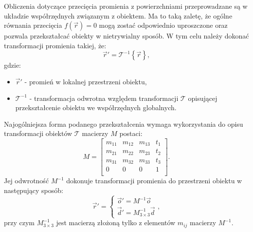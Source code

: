 \begin{enumerate}

Obliczenia dotyczące przecięcia promienia z powierzchniami przeprowadzane są w układzie współrzędnych związanym z obiektem. Ma to taką zaletę, że ogólne równania przecięcia $f(\vec{r})=0$ mogą zostać odpowiednio uproszczone oraz pozwala przekształcać obiekty w nietrywialny sposób. W tym celu należy dokonać transformacji promienia takiej, że:
\begin{equation}
\vec{r}' = \mathcal{T}^{-1}\left\lbrace\vec{r}\right\rbrace,
\end{equation}
gdzie:
\begin{itemize}
\item[] $\vec{r}'$ - promień w lokalnej przestrzeni obiektu,
\item[] $\mathcal{T}^{-1}$ - transformacja odwrotna względem transformacji $\mathcal{T}$ opisującej przekształcenie obiektu we współrzędnych globalnych.
\end{itemize}
Najogólniejsza forma podanego przekształcenia wymaga wykorzystania do opisu transformacji obiektów $\mathcal{T}$  macierzy $M$ postaci:
\begin{equation}
M = 
\begin{bmatrix}
    m_{11} & m_{12} & m_{13}  & t_{1} \\
    m_{21} & m_{22} & m_{23}   & t_{2} \\
    m_{31} & m_{32} & m_{33}   & t_{3} \\
    0 & 0 & 0 & 1 \\
\end{bmatrix}.
\end{equation}
Jej odwrotność $M^{-1}$ dokonuje transformacji promienia do przestrzeni obiektu w następujący sposób:
\begin{equation}
\vec{r}' = 
\begin{cases}
\vec{o}' = M^{-1}\vec{o}\\
\vec{d}' = M_{3\times 3}^{-1}\vec{d}
\end{cases},
\end{equation}
przy czym $M_{3\times 3}^{-1}$ jest macierzą złożoną tylko z elementów $m_{ij}$ macierzy $M^{-1}$.


\end{enumerate}
